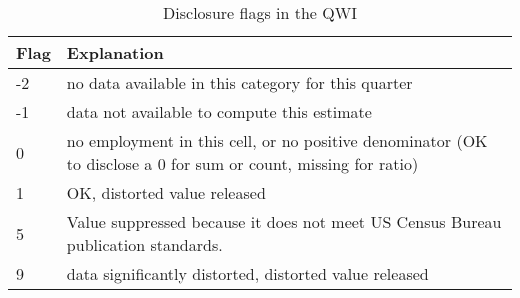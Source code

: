                       


%

\begin{table}[htbp]
  \centering
  \caption{Disclosure flags in the QWI}
  \label{tab:disclosure_flags}
  \begin{tabular}{lp{4in}}
Flag & Explanation \\
\hline
 -2 &no data available in this category for this quarter\\
 -1 &data not available to compute this estimate\\
 0  &    no employment in this cell, or no positive denominator
         (OK to disclose a 0 for sum or count, missing for ratio)\\
 1  &    OK, distorted value released\\
5   &    Value suppressed because it does not meet US Census Bureau publication
         standards.\\
 9  &    data significantly distorted, distorted value released\\
\hline
  \end{tabular}
\end{table}

